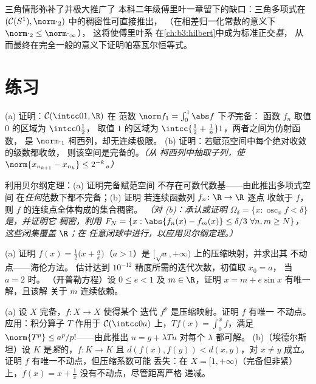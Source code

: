 \begin{remark}\label{rem:b3:complete:swremark}
三角情形弥补了并极大推广了
本科二年级傅里叶一章留下的缺口：三角多项式在
$(\mathcal C(S^1), \norm\cdot_2)$ 中的稠密性可直接推出，
（在相差归一化常数的意义下 $\norm\cdot_2 \leq \norm\cdot_\infty$），
这将使傅里叶系
在\cref{ch:b3:hilbert}中成为标准正交\emph{基}，
从而最终在完全一般的意义下证明帕塞瓦尔恒等式。
\end{remark}

\section{练习}

\begin{exercise}[$\star$]\label{exo:b3:complete:1}
(a) 证明：$\mathcal C(\intcc01, \R)$ 在
范数 $\norm f_1 = \int_0^1\abs f$ 下\emph{不}完备：
函数 $f_n$ 取值 $0$ 的区域为 $\intcc0{\frac12}$，
取值 $1$ 的区域为 $\intcc{\frac12 + \frac1n}1$，两者之间为仿射函数，
是 $\norm\cdot_1$ 柯西列，却无连续极限。
(b) 证明：若赋范空间中每个绝对收敛的级数都收敛，
则该空间是完备的。\emph{（从
柯西列中抽取子列，使 $\norm{x_{n_{k+1}} -
x_{n_k}} \leq 2^{-k}$。）}
\end{exercise}

\begin{exercise}[$\star$]\label{exo:b3:complete:2}
利用贝尔纲定理：(a) 证明完备赋范空间
不存在可数代数基——由此推出多项式空间
在\emph{任何}范数下都不完备；(b) 证明
若连续函数列 $f_n \colon \R \to \R$ 逐点
收敛于 $f$，则 $f$ 的连续点全体构成的集合稠密。
\emph{（对 (b)：承认或证明 $\Omega_\delta = \{x :
\operatorname{osc}_x f < \delta\}$ 是，并证明它
稠密，利用 $F_{N} = \{x: \abs{f_n(x) - f_m(x)} \leq \delta/3\
\forall n,m \geq N\}$，这些闭集覆盖 $\R$；在
任意闭球中进行，以应用贝尔纲定理。）}
\end{exercise}

\begin{exercise}[$\star\star$]\label{exo:b3:complete:3}
(a) 证明 $f(x) = \frac12\bigl(x + \frac ax\bigr)$（$a >
1$）是 $[\sqrt a, +\infty)$ 上的压缩映射，并求出其
不动点——海伦方法。
估计达到 $10^{-12}$ 精度所需的迭代次数，初值取 $x_0 = a$，
当 $a = 2$ 时。
（开普勒方程）设 $0 \leq e < 1$ 及 $m \in \R$，证明
$x = m + e\sin x$ 有唯一解，且该解
关于 $m$ 连续依赖。
\end{exercise}

\begin{exercise}[$\star\star$]\label{exo:b3:complete:4}
(a) 设 $X$ 完备，$f \colon X \to X$ 使得某个
迭代 $f^p$ 是压缩映射。证明 $f$ 有唯一
不动点。应用：积分算子 $T$ 作用于
$\mathcal C(\intcc0a)$ 上，$Tf(x) = \int_0^x f$，满足
$\norm{T^p} \leq a^p/p!$——由此推出
$u = g + \lambda Tu$ 对每个 $\lambda$ 都可解。
(b)（埃德尔斯坦）设 $K$ 是\emph{紧}的，$f\colon K \to K$
且 $d(f(x), f(y)) < d(x, y)$，对 $x \neq y$ 成立。证明 $f$
有唯一不动点，但压缩系数可能
丢失：在 $X = [1, +\infty)$（完备但非紧）上，$f(x) = x
+ \frac1x$ 没有不动点，尽管距离严格
递减。
\end{exercise}


